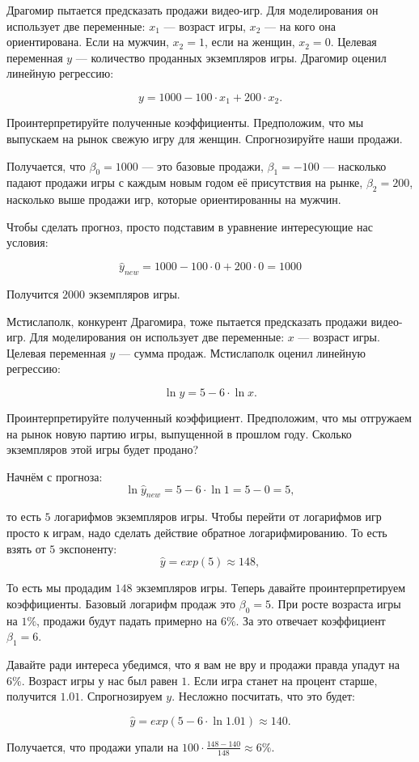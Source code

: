\documentclass[12pt, a4paper, oneside]{article}
\theoremstyle{plain} %
\theoremstyle{definition}
\newcounter{problem}%
\renewcommand{\theproblem}{\arabic{problem}}
\newenvironment{problem}[1]{
\addtocounter{problem}{1}\noindent{ \color{titleblue} \large \bfseries Упражнение~\theproblem~#1 \vspace{1ex} \newline}
}{ }
\begin{document}
\begin{problem}{ }
Драгомир пытается предсказать продажи видео-игр.  Для моделирования он использует две переменные: $x_1$ --- возраст игры, $x_2$ --- на кого она ориентирована. Если на мужчин, $x_2=1$, если на женщин, $x_2=0$. Целевая переменная $y$ --- количество проданных экземпляров игры. Драгомир оценил линейную регрессию: 

$$ y = 1000 - 100 \cdot  x_1 + 200 \cdot  x_2.$$

Проинтерпретируйте полученные коэффициенты.  Предположим, что мы выпускаем на рынок свежую игру для женщин. Спрогнозируйте наши продажи. 
\end{problem}

\begin{solution}
Получается, что $\beta_0 = 1000$ --- это базовые продажи, $\beta_1 = -100$ --- насколько падают продажи игры с каждым новым годом её присутствия на рынке, $\beta_2 = 200$, насколько выше продажи игр, которые ориентированны на мужчин.

Чтобы сделать прогноз, просто подставим в уравнение интересующие нас условия: 

$$ 
\hat y_{new} = 1000 - 100 \cdot 0 + 200 \cdot 0 = 1000
$$

Получится $2000$ экземпляров игры. 
\end{solution}


\begin{problem}{ }
Мстислаполк, конкурент Драгомира, тоже пытается предсказать продажи видео-игр.  Для моделирования он использует две переменные: $x$ --- возраст игры. Целевая переменная $y$ --- сумма продаж. Мстислаполк оценил линейную регрессию: 

$$ 
\ln y = 5 - 6 \cdot  \ln x.
$$

Проинтерпретируйте полученный коэффициент.  Предположим, что мы отгружаем на рынок новую партию игры, выпущенной в прошлом году. Сколько экземпляров этой игры будет продано? 
\end{problem}

\begin{solution}
Начнём с прогноза: 
$$ 
\ln \hat y_{new} = 5 - 6 \cdot \ln 1 = 5 - 0 = 5,
$$

то есть $5$ логарифмов экземпляров игры. Чтобы перейти от логарифмов игр просто к играм, надо сделать действие обратное логарифмированию. То есть взять от $5$ экспоненту: 
$$
\hat y = exp(5) \approx 148,
$$

То есть мы продадим $148$ экземпляров игры. Теперь давайте проинтерпретируем коэффициенты. Базовый логарифм продаж это $\beta_0 = 5$.  При росте возраста игры на $1\%$, продажи будут падать примерно на $6\%$. За это отвечает коэффициент $\beta_1 = 6$. 

Давайте ради интереса убедимся, что я вам не вру и продажи правда упадут на $6\%.$  Возраст игры у нас был равен $1$. Если игра станет на процент старше, получится $1.01$. Спрогнозируем $y$. Несложно посчитать, что это будет:

$$
\hat y = exp(5 - 6 \cdot \ln 1.01) \approx 140.
$$

Получается, что продажи упали на $100 \cdot \frac{148-140}{148} \approx 6\%$.
\end{solution}
\end{document}
